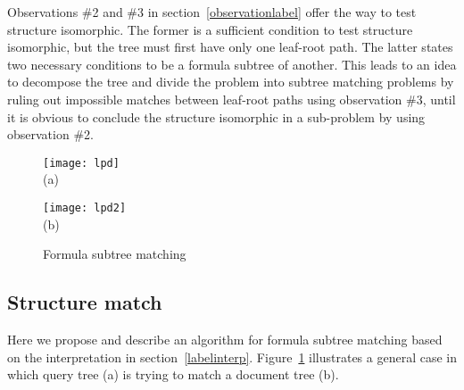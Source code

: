 Observations \#2 and \#3 in section~\ref{observationlabel} offer the way to test structure isomorphic.
The former is a sufficient condition to test structure isomorphic, but the tree must first have only one leaf-root path. The latter states two necessary conditions to be a formula subtree of another.
This leads to an idea to decompose the tree and divide the problem into subtree matching problems by ruling out impossible matches between leaf-root paths using observation \#3, until it is obvious to conclude the structure isomorphic in a sub-problem by using observation \#2.

\begin{figure}
\begin{minipage}[b]{2.65in}
\begin{center}
\texttt{[image: lpd]}
\\ (a)
\end{center}
\end{minipage}
\hspace*{.38in}
\begin{minipage}[b]{2.65in}
\begin{center}
{\texttt{[image: lpd2]}}
\\ (b) 
\end{center}
\end{minipage}
\caption{Formula subtree matching}\label{submatch}
\end{figure}

\subsection{Structure match}
Here we propose and describe an algorithm for formula subtree matching based on the interpretation in section~\ref{labelinterp}.
Figure~\ref{submatch} illustrates a general case in which query tree (a) is trying to match a document tree (b).

